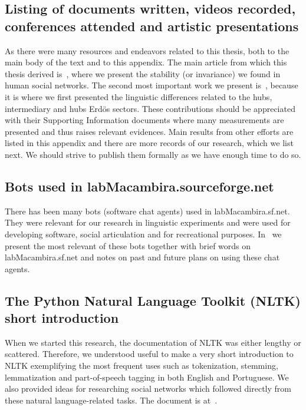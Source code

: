\begin{apendicesenv}
\section{Listing of documents written, videos recorded, conferences attended and artistic presentations}
As there were many resources and endeavors related to this thesis,
both to the main body of the text and to this appendix.
The main article from which this thesis derived is~\cite{stab},
where we present the stability (or invariance) we found in human social networks.
The second most important work we present is~\cite{rcText}, because it is where we
first presented the linguistic differences related to the hubs, intermediary and hubs
Erd\"os sectors.
These contributions should be appreciated with their Supporting Information documents
where many measurements are presented and thus raises relevant evidences.
Main results from other efforts are listed in this appendix and there
are more records of our research, which we list next.
We should strive to publish them formally as we have enough time to do so.

\subsection{Bots used in labMacambira.sourceforge.net}
There has been many bots (software chat agents) used in labMacambira.sf.net.
They were relevant for our research in linguistic experiments and were used
for developing software, social articulation and for recreational purposes.
In~\cite{trabBots} we present the most relevant of these bots together with
brief words on labMacambira.sf.net and notes on past and future plans on using
these chat agents.

\subsection{The Python Natural Language Toolkit (NLTK) short introduction}
When we started this research, the documentation of NLTK was either lengthy or
scattered.
Therefore, we understood useful to make a very short introduction to NLTK
exemplifying the most frequent uses such as tokenization, stemming, lemmatization and
part-of-speech tagging in both English and Portuguese.
We also provided ideas for researching social networks which followed directly from
these natural language-related tasks.
The document is at~\cite{trabNLTK}.


\end{apendicesenv}

